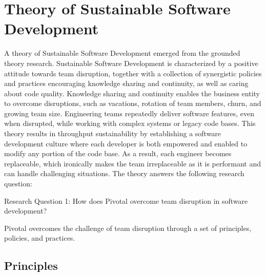 \section{Theory of Sustainable Software Development}
\label{Theory}

A theory of Sustainable Software Development emerged from the grounded theory research. Sustainable Software Development is characterized by a positive attitude towards team disruption, together with a collection of synergistic policies and practices encouraging knowledge sharing and continuity, as well as caring about code quality. Knowledge sharing and continuity enables the business entity to overcome disruptions, such as vacations, rotation of team members, churn, and growing team size. Engineering teams repeatedly deliver software features, even when disrupted, while working with complex systems or legacy code bases. This theory results in throughput sustainability by establishing a software development culture where each developer is both empowered and enabled to modify any portion of the code base. As a result, each engineer becomes replaceable, which ironically makes the team irreplaceable as it is performant and can handle challenging situations. The theory answers the following research question:

Research Question 1: How does Pivotal overcome team disruption in software development?

Pivotal overcomes the challenge of team disruption through a set of principles, policies, and practices.

\subsection{Principles}

